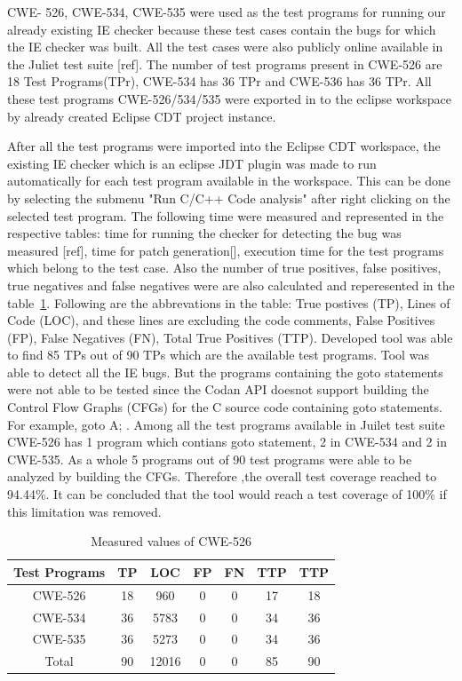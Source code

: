 CWE- 526, CWE-534, CWE-535 were used as the test programs for running our already existing IE checker
because these test cases contain the bugs for which the IE checker was built.
All the test cases were also publicly online available in the 
Juliet test suite [ref]. The number of test programs present in CWE-526 are 18 Test Programs(TPr),
CWE-534 has 36 TPr and CWE-536 has 36 TPr. All these test programs CWE-526/534/535 were 
exported in to the eclipse workspace by already created Eclipse CDT project instance.

After all the test programs were imported into the Eclipse CDT workspace,
the existing IE checker which is an eclipse JDT plugin was made to 
run automatically for each test program available in the workspace.
This can be done by selecting the submenu "Run C/C++ Code analysis" after
right clicking on the selected test program. The following time were measured
and represented in the respective tables: time for running the checker for detecting the bug was
measured [ref], time for patch generation[], execution time for the test programs which belong
to the test case.
Also the number of true positives, false positives, true negatives and false negatives
were are also calculated and reperesented in the table~\ref{table:errors}. 
Following are the abbrevations in the table: True postives (TP), Lines of Code (LOC),
and these lines are excluding the code comments, False Positives (FP), False Negatives (FN),
Total True Positives (TTP). Developed tool was able to find 85 TPs out of 90 TPs
which are the available test programs. Tool was able to detect all the IE bugs.
But the programs containing the goto statements were not able to be tested since
the Codan API doesnot support building the Control Flow Graphs (CFGs) for the 
C source code containing goto statements. For example, goto A; .
Among all the test programs available in Juilet test suite CWE-526 has 1 program
which contians goto statement, 2 in CWE-534 and 2 in CWE-535. As a whole 5 programs
out of 90 test programs were able to be analyzed by building the CFGs. Therefore
,the overall test coverage reached to 94.44\%. It can be concluded that 
the tool would reach a test coverage of 100\% if this limitation was removed.


\begin{table}[h!]
\centering
 \begin{tabular}{||c |c |c |c |c| c|c||} 
 \hline
 \textbf{Test Programs} & \textbf{TP} & \textbf{LOC} & \textbf{FP} & \textbf{FN}& \textbf{TTP}&
 \textbf{TTP}\\ [0.5ex]
 \hline
CWE-526&18&960&0&0&17&18\\
\hline
CWE-534&36&5783&0&0&34&36\\
\hline
CWE-535&36&5273&0&0&34&36\\
\hline
Total&90&12016&0&0&85&90\\
\hline
 \hline
\end{tabular}
\caption{Measured values of CWE-526}
\label{table:errors}
\end{table}

